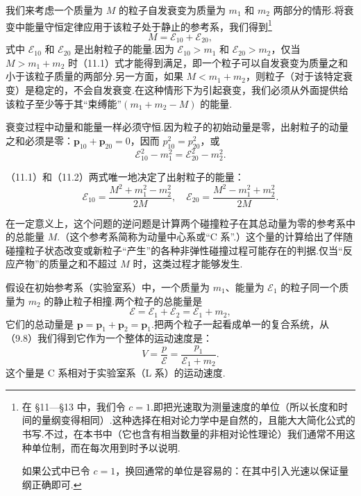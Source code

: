 我们来考虑一个质量为 $M$ 的粒子自发衰变为质量为 $m_1$ 和 $m_2$ 两部分的情形.将衰变中能量守恒定律应用于该粒子处于静止的参考系，我们得到\footnote{在 §11—§13 中，我们令 $c=1$.即把光速取为测量速度的单位（所以长度和时间的量纲变得相同）.这种选择在相对论力学中是自然的，且能大大简化公式的书写.不过，在本书中（它也含有相当数量的非相对论性理论）我们通常不用这种单位制，而在每次用到时予以说明.
\par 如果公式中已令 $c=1$，换回通常的单位是容易的：在其中引入光速以保证量纲正确即可.}
\begin{equation}
  M=\mathcal{E}_{10}+\mathcal{E}_{20},
\end{equation}
式中 $\mathcal{E}_{10}$ 和 $\mathcal{E}_{20}$ 是出射粒子的能量.因为 $\mathcal{E}_{10}>m_1$ 和 $\mathcal{E}_{20}>m_2$，仅当 $M>m_1+m_2$ 时（11.1）式才能得到满足，即一个粒子可以自发衰变为质量之和小于该粒子质量的两部分.另一方面，如果 $M<m_1+m_2$，则粒子（对于该特定衰变）是稳定的，不会自发衰变.在这种情形下为引起衰变，我们必须从外面提供给该粒子至少等于其“束缚能”$(m_1+m_2-M)$ 的能量.

衰变过程中动量和能量一样必须守恒.因为粒子的初始动量是零，出射粒子的动量之和必须是零：$\boldsymbol{p}_{10}+\boldsymbol{p}_{20}=0$，因而 $p_{10}^2=p_{20}^2$，或
\begin{equation}
  \mathcal{E}_{10}^2-m_1^2=\mathcal{E}_{20}^2-m_2^2.
\end{equation}

（11.1）和（11.2）两式唯一地决定了出射粒子的能量：
\begin{equation}
  \mathcal{E}_{10}=\frac{M^2+m_1^2-m_2^2}{2M},\quad
  \mathcal{E}_{20}=\frac{M^2-m_1^2+m_2^2}{2M}.
\end{equation}

在一定意义上，这个问题的逆问题是计算两个碰撞粒子在其总动量为零的参考系中的总能量 $M$.（这个参考系简称为动量中心系或“C 系”.）这个量的计算给出了伴随碰撞粒子状态改变或新粒子“产生”的各种非弹性碰撞过程可能存在的判据.仅当“反应产物”的质量之和不超过 $M$ 时，这类过程才能够发生.

假设在初始参考系（实验室系）中，一个质量为 $m_1$、能量为 $\mathcal{E}_1$ 的粒子同一个质量为 $m_2$ 的静止粒子相撞.两个粒子的总能量是
\begin{equation*}
  \mathcal{E}=\mathcal{E}_1+\mathcal{E}_2=\mathcal{E}_1+m_2,
\end{equation*}
它们的总动量是 $\boldsymbol{p}=\boldsymbol{p}_1+\boldsymbol{p}_2=\boldsymbol{p}_1$.把两个粒子一起看成单一的复合系统，从（9.8）我们得到它作为一个整体的运动速度是：
\begin{equation}
  V=\frac{p}{\mathcal{E}}=\frac{p_1}{\mathcal{E}_1+m_2}.
\end{equation}
这个量是 C 系相对于实验室系（L 系）的运动速度.

